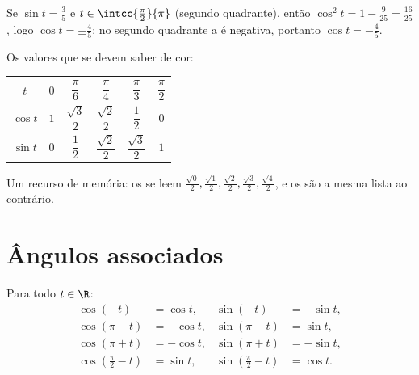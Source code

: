 \begin{example}\label{ex:g11:trigo:identity}
Se $\sin t = \frac35$ e $t \in \intcc{\frac\pi2}{\pi}$ (segundo
quadrante), então $\cos^2 t = 1 - \frac{9}{25} = \frac{16}{25}$, logo
$\cos t = \pm\frac45$; no segundo quadrante a  é negativa,
portanto $\cos t = -\frac45$.
\end{example}

Os valores que se devem saber de cor:
\begin{center}
\begin{tabular}{c|ccccc}
$t$ & $0$ & $\dfrac{\pi}{6}$ & $\dfrac{\pi}{4}$ & $\dfrac{\pi}{3}$ & $\dfrac{\pi}{2}$\\[6pt]
\hline\rule{0pt}{14pt}%
$\cos t$ & $1$ & $\dfrac{\sqrt3}{2}$ & $\dfrac{\sqrt2}{2}$ & $\dfrac12$ & $0$\\[6pt]
$\sin t$ & $0$ & $\dfrac12$ & $\dfrac{\sqrt2}{2}$ & $\dfrac{\sqrt3}{2}$ & $1$
\end{tabular}
\end{center}

\begin{remark}
Um recurso de memória: os  se leem
$\frac{\sqrt0}{2}, \frac{\sqrt1}{2}, \frac{\sqrt2}{2}, \frac{\sqrt3}{2},
\frac{\sqrt4}{2}$, e os  são a mesma lista ao contrário.
\end{remark}

\section{Ângulos associados}

\begin{proposition}\label{prop:g11:trigo:associated}
Para todo $t \in \R$:
\[
\begin{aligned}
\cos(-t) &= \cos t, & \sin(-t) &= -\sin t,\\
\cos(\pi - t) &= -\cos t, & \sin(\pi - t) &= \sin t,\\
\cos(\pi + t) &= -\cos t, & \sin(\pi + t) &= -\sin t,\\
\cos\left(\tfrac{\pi}{2} - t\right) &= \sin t, &
\sin\left(\tfrac{\pi}{2} - t\right) &= \cos t .
\end{aligned}
\]
\end{proposition}

